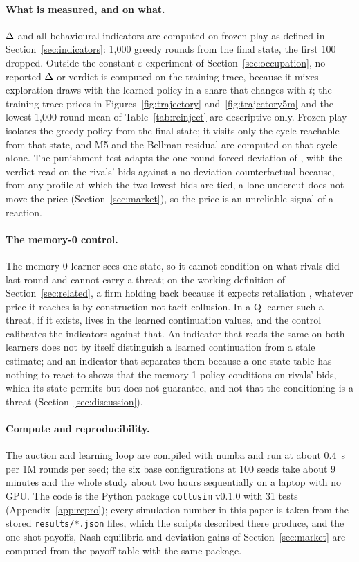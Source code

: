 \paragraph{What is measured, and on what.}
$\Delta$ and all behavioural indicators are computed on frozen play as defined in Section~\ref{sec:indicators}: 1,000 greedy rounds from the final state, the first 100 dropped. Outside the constant-$\varepsilon$ experiment of Section~\ref{sec:occupation}, no reported $\Delta$ or verdict is computed on the training trace, because it mixes exploration draws with the learned policy in a share that changes with $t$; the training-trace prices in Figures~\ref{fig:trajectory} and~\ref{fig:trajectory5m} and the lowest 1,000-round mean of Table~\ref{tab:reinject} are descriptive only. Frozen play isolates the greedy policy from the final state; it visits only the cycle reachable from that state, and M5 and the Bellman residual are computed on that cycle alone. The punishment test adapts the one-round forced deviation of \citet{calvano2020}, with the verdict read on the rivals' bids against a no-deviation counterfactual because, from any profile at which the two lowest bids are tied, a lone undercut does not move the price (Section~\ref{sec:market}), so the price is an unreliable signal of a reaction.

\paragraph{The memory-0 control.}
The memory-0 learner sees one state, so it cannot condition on what rivals did last round and cannot carry a threat; on the working definition of Section~\ref{sec:related}, a firm holding back because it expects retaliation \citep{tirole1988,ivaldi2003}, whatever price it reaches is by construction not tacit collusion. In a Q-learner such a threat, if it exists, lives in the learned continuation values, and the control calibrates the indicators against that. An indicator that reads the same on both learners does not by itself distinguish a learned continuation from a stale estimate; and an indicator that separates them because a one-state table has nothing to react to shows that the memory-1 policy conditions on rivals' bids, which its state permits but does not guarantee, and not that the conditioning is a threat (Section~\ref{sec:discussion}).

\paragraph{Compute and reproducibility.}
The auction and learning loop are compiled with numba and run at about 0.4~s per 1M rounds per seed; the six base configurations at 100 seeds take about 9 minutes and the whole study about two hours sequentially on a laptop with no GPU. The code is the Python package \texttt{collusim} v0.1.0 with 31 tests (Appendix~\ref{app:repro}); every simulation number in this paper is taken from the stored \texttt{results/*.json} files, which the scripts described there produce, and the one-shot payoffs, Nash equilibria and deviation gains of Section~\ref{sec:market} are computed from the payoff table with the same package.
